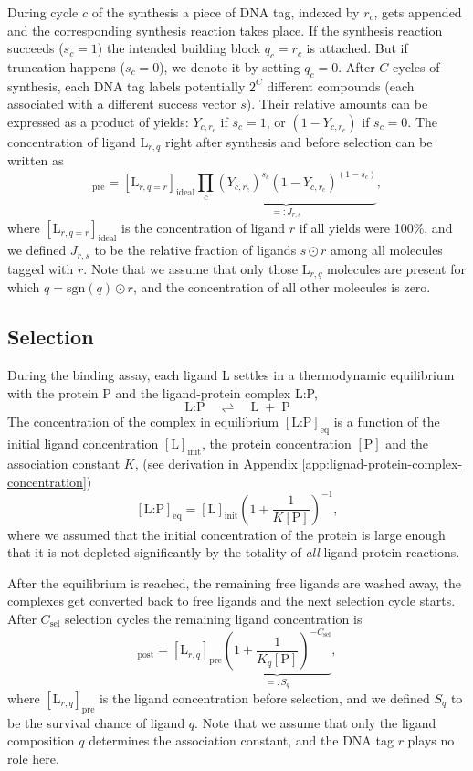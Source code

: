 \documentclass[letter,10pt,oneside]{article}
\newcommand{\bel}{\begin{equation}}
\newcommand{\eel}{\end{equation}}
\newcommand{\+}{^\dagger}
\begin{document}
During cycle $c$ of the synthesis a piece of DNA tag, indexed by $r_c$, gets appended and the corresponding synthesis reaction takes place. If the synthesis reaction succeeds ($s_c = 1$) the intended building block $q_c = r_c$ is attached. But if truncation happens ($s_c = 0$), we denote it by setting $q_c = 0$. After $C$ cycles of synthesis, each DNA tag labels potentially $2^C$ different compounds (each associated with a different success vector $s$). Their relative amounts can be expressed as a product of yields: $Y_{c, r_c}$ if $s_c = 1$, or $(1 - Y_{c, r_c})$ if $s_c = 0$. The concentration of ligand $\text{L}_{r,q}$ right after synthesis and before selection can be written as 
\bel
  [\text{L}_{r,q=s\odot r}]_\text{pre} = [\text{L}_{r,q=r}]_\text{ideal} \underbrace{\prod_c (Y_{c, r_c})^{s_c} (1 - Y_{c, r_c})^{(1 - s_c)}}_{=:J_{r, s}},
\eel
where $[\text{L}_{r,q=r}]_\text{ideal}$ is the concentration of ligand $r$ if all yields were 100\%, and we defined $J_{r,s}$ to be the relative fraction of ligands $s\odot r$ among all molecules tagged with $r$. Note that we assume that only those $\text{L}_{r,q}$ molecules are present for which $q = \text{sgn}(q)\odot r$, and the concentration of all other molecules is zero.


\subsection{Selection}

During the binding assay, each ligand L settles in a thermodynamic equilibrium with the protein P and the ligand-protein complex L:P,
\bel
\label{eq:L-P-reaction}
  \text{L:P} \quad \rightleftharpoons \quad \text{L} \; + \; \text{P}
\eel
The concentration of the complex in equilibrium $[\text{L:P}]_\text{eq}$ is a function of the initial ligand concentration $[\text{L}]_\text{init}$, the protein concentration $[\text{P}]$ and the association constant $K$, (see derivation in Appendix \ref{app:lignad-protein-complex-concentration})
\bel
\label{eq:L:P_concentration}
  [\text{L:P}]_\text{eq} = [\text{L}]_\text{init} \left(1 + \frac{1}{K[\text{P}]}\right)^{-1},
\eel
where we assumed that the initial concentration of the protein is large enough that it is not depleted significantly by the totality of \emph{all} ligand-protein reactions.

After the equilibrium is reached, the remaining free ligands are washed away, the complexes get converted back to free ligands and the next selection cycle starts. After $C_\text{sel}$ selection cycles the remaining ligand concentration is 
\bel
  [\text{L}_{r,q}]_\text{post} = [\text{L}_{r,q}]_\text{pre} \underbrace{\left(1 + \frac{1}{K_q[\text{P}]}\right)^{-C_\text{sel}}}_{=:S_q},
\eel
where $[\text{L}_{r,q}]_\text{pre}$ is the ligand concentration before selection, and we defined $S_q$ to be the survival chance of ligand $q$. Note that we assume that only the ligand composition $q$ determines the association constant, and the DNA tag $r$ plays no role here.
\end{document}
